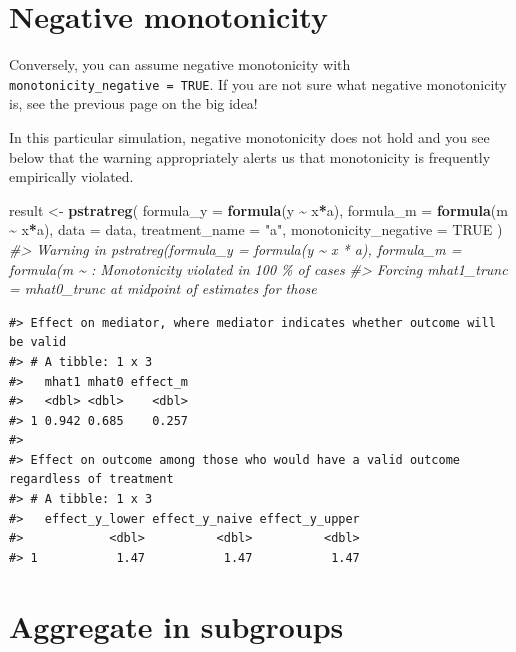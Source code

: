 \documentclass[
]{book}
\newenvironment{Shaded}{\begin{snugshade}}{\end{snugshade}}
\newcommand{\AttributeTok}[1]{\textcolor[rgb]{0.13,0.29,0.53}{#1}}
\newcommand{\CommentTok}[1]{\textcolor[rgb]{0.56,0.35,0.01}{\textit{#1}}}
\newcommand{\ConstantTok}[1]{\textcolor[rgb]{0.56,0.35,0.01}{#1}}
\newcommand{\FunctionTok}[1]{\textcolor[rgb]{0.13,0.29,0.53}{\textbf{#1}}}
\newcommand{\NormalTok}[1]{#1}
\newcommand{\OtherTok}[1]{\textcolor[rgb]{0.56,0.35,0.01}{#1}}
\newcommand{\SpecialCharTok}[1]{\textcolor[rgb]{0.81,0.36,0.00}{\textbf{#1}}}
\newcommand{\StringTok}[1]{\textcolor[rgb]{0.31,0.60,0.02}{#1}}
\begin{document}
\hypertarget{negative-monotonicity}{%
\section{Negative monotonicity}\label{negative-monotonicity}}

Conversely, you can assume negative monotonicity with \texttt{monotonicity\_negative\ =\ TRUE}. If you are not sure what negative monotonicity is, see the previous page on the big idea!

In this particular simulation, negative monotonicity does not hold and you see below that the warning appropriately alerts us that monotonicity is frequently empirically violated.

\begin{Shaded}
\begin{Highlighting}[]
\NormalTok{result }\OtherTok{\textless{}{-}} \FunctionTok{pstratreg}\NormalTok{(}
  \AttributeTok{formula\_y =} \FunctionTok{formula}\NormalTok{(y }\SpecialCharTok{\textasciitilde{}}\NormalTok{ x}\SpecialCharTok{*}\NormalTok{a),}
  \AttributeTok{formula\_m =} \FunctionTok{formula}\NormalTok{(m }\SpecialCharTok{\textasciitilde{}}\NormalTok{ x}\SpecialCharTok{*}\NormalTok{a),}
  \AttributeTok{data =}\NormalTok{ data,}
  \AttributeTok{treatment\_name =} \StringTok{"a"}\NormalTok{,}
  \AttributeTok{monotonicity\_negative =} \ConstantTok{TRUE}
\NormalTok{)}
\CommentTok{\#\textgreater{} Warning in pstratreg(formula\_y = formula(y \textasciitilde{} x * a), formula\_m = formula(m \textasciitilde{} : Monotonicity violated in 100 \% of cases}
\CommentTok{\#\textgreater{} Forcing mhat1\_trunc = mhat0\_trunc at midpoint of estimates for those}
\end{Highlighting}
\end{Shaded}

\begin{verbatim}
#> Effect on mediator, where mediator indicates whether outcome will be valid
#> # A tibble: 1 x 3
#>   mhat1 mhat0 effect_m
#>   <dbl> <dbl>    <dbl>
#> 1 0.942 0.685    0.257
#> 
#> Effect on outcome among those who would have a valid outcome regardless of treatment
#> # A tibble: 1 x 3
#>   effect_y_lower effect_y_naive effect_y_upper
#>            <dbl>          <dbl>          <dbl>
#> 1           1.47           1.47           1.47
\end{verbatim}

\hypertarget{aggregate-in-subgroups}{%
\section{Aggregate in subgroups}\label{aggregate-in-subgroups}}
\end{document}
